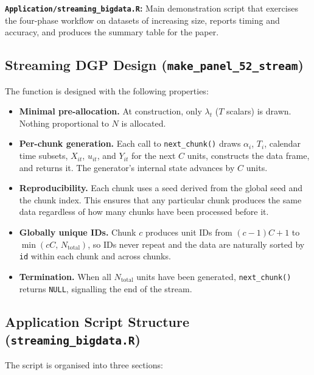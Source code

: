 \documentclass[11pt, a4paper]{article}
\begin{document}
\textbf{\texttt{Application/streaming\_bigdata.R}:}
Main demonstration script that exercises the four-phase workflow on datasets of
increasing size, reports timing and accuracy, and produces the summary table
for the paper.

\subsection{Streaming DGP Design (\texttt{make\_panel\_52\_stream})}

The function is designed with the following properties:

\begin{itemize}
  \item \textbf{Minimal pre-allocation.}  At construction, only $\lambda_t$
        ($T$ scalars) is drawn.  Nothing proportional to $N$ is allocated.

  \item \textbf{Per-chunk generation.}  Each call to \texttt{next\_chunk()}
        draws $\alpha_i$, $T_i$, calendar time subsets, $X_{it}$, $u_{it}$,
        and $Y_{it}$ for the next $C$ units, constructs the data frame, and
        returns it.  The generator's internal state advances by $C$ units.

  \item \textbf{Reproducibility.}  Each chunk uses a seed derived from the
        global seed and the chunk index.  This ensures that any particular
        chunk produces the same data regardless of how many chunks have been
        processed before it.

  \item \textbf{Globally unique IDs.}  Chunk $c$ produces unit IDs from
        $(c-1)C + 1$ to $\min(cC,\, N_{\mathrm{total}})$, so IDs never
        repeat and the data are naturally sorted by \texttt{id} within each
        chunk and across chunks.

  \item \textbf{Termination.}  When all $N_{\mathrm{total}}$ units have been
        generated, \texttt{next\_chunk()} returns \texttt{NULL}, signalling
        the end of the stream.
\end{itemize}

\subsection{Application Script Structure (\texttt{streaming\_bigdata.R})}

The script is organised into three sections:
\end{document}
